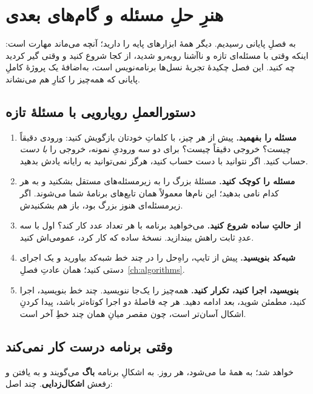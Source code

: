 \chapter{هنرِ حلِ مسئله و گام‌های بعدی}%
\label{ch:problem-solving}

به فصلِ پایانی رسیدیم. دیگر همهٔ ابزارهای پایه را دارید؛ آنچه می‌ماند
مهارت است: اینکه وقتی با مسئله‌ای تازه و ناآشنا روبه‌رو شدید، از کجا شروع
کنید و وقتی گیر کردید چه کنید. این فصل چکیدهٔ تجربهٔ نسل‌ها برنامه‌نویس
است، به‌اضافهٔ یک پروژهٔ کاملِ پایانی که همه‌چیز را کنارِ هم می‌نشاند.

\section{دستورالعملِ رویارویی با مسئلهٔ تازه}

\begin{enumerate}
  \item \textbf{مسئله را بفهمید.} پیش از هر چیز، با کلماتِ خودتان
        بازگویش کنید: ورودی دقیقاً چیست؟ خروجی دقیقاً چیست؟ برای دو سه
        ورودیِ نمونه، خروجی را \emph{با دست} حساب کنید. اگر نتوانید با
        دست حساب کنید، هرگز نمی‌توانید به رایانه یادش بدهید.
  \item \textbf{مسئله را کوچک کنید.} مسئلهٔ بزرگ را به زیرمسئله‌های
        مستقل بشکنید و به هر کدام نامی بدهید؛ این نام‌ها معمولاً همان
        تابع‌های برنامهٔ شما می‌شوند. اگر زیرمسئله‌ای هنوز بزرگ بود، باز
        هم بشکنیدش.
  \item \textbf{از حالتِ ساده شروع کنید.} می‌خواهید برنامه با هر تعداد
        عدد کار کند؟ اول با سه عددِ ثابت راهش بیندازید. نسخهٔ ساده که
        کار کرد، عمومی‌اش کنید.
  \item \textbf{شبه‌کد بنویسید.} پیش از تایپ، راهِ‌حل را در چند خط
        شبه‌کد بیاورید و یک اجرای دستی کنید؛ همان عادتِ فصلِ~\ref{ch:algorithms}.
  \item \textbf{بنویسید، اجرا کنید، تکرار کنید.} همه‌چیز را یک‌جا ننویسید.
        چند خط بنویسید، اجرا کنید، مطمئن شوید، بعد ادامه دهید. هر چه
        فاصلهٔ دو اجرا کوتاه‌تر باشد، پیدا کردنِ اشکال آسان‌تر است، چون
        مقصر میانِ همان چند خطِ آخر است.
\end{enumerate}

\section{وقتی برنامه درست کار نمی‌کند}

خواهد شد؛ به همهٔ ما می‌شود، هر روز. به اشکالِ برنامه \textbf{باگ}
می‌گویند و به یافتن و رفعش \textbf{اشکال‌زدایی}. چند اصل:

